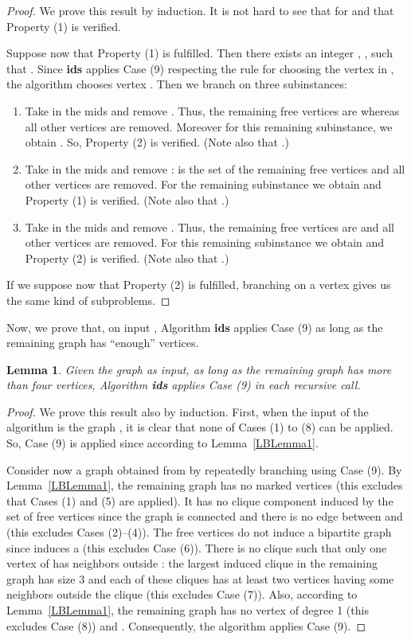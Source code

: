 \documentclass[a4paper,10pt]{article}
\theoremstyle{plain}
\newtheorem{lemma}[theorem]{Lemma}
\theoremstyle{definition}
\theoremstyle{remark}
\newcommand{\mids}{mids\xspace}
\begin{document}
\begin{proof}
We prove this result by induction. It is not hard to see that 
for  and that Property (1) is verified.

Suppose now that Property (1) is fulfilled. Then there exists an integer , ,
such that .
Since {\bf ids} applies Case (9) respecting the rule for choosing the vertex in ,
the algorithm chooses vertex .
Then we branch on three subinstances:
\begin{enumerate}[(b1)]
\item Take  in the \mids and remove .
Thus, the remaining free vertices are 
whereas all other vertices are removed. Moreover for this remaining
subinstance, we obtain . So, Property
(2) is verified.
(Note also that .)

\item Take  in the \mids and remove :
 is the set of the remaining free vertices
and all other vertices are removed. For the remaining
subinstance we obtain 
and Property (1) is verified.
(Note also that .)

\item Take  in the \mids and remove . Thus,
the remaining free vertices are 
and all other vertices are removed. For this remaining
subinstance we obtain 
and Property (2) is verified.
(Note also that .)
\end{enumerate}

If we suppose now that Property (2) is fulfilled, branching on
a vertex  gives us the same kind of subproblems.
\end{proof}

Now, we prove that, on input ,
Algorithm {\bf ids} applies Case (9) as long as
the remaining graph has ``enough'' vertices.

\begin{lemma}
Given the graph  as input,
as long as the remaining graph has more than four vertices,
Algorithm {\bf ids} applies Case (9) in each recursive call.
\end{lemma}

\begin{proof}
We prove this result also by induction.
First, when the input of the algorithm is the graph ,
it is clear that none of Cases (1) to (8) can be applied.
So, Case (9) is applied since  according
to Lemma~\ref{LBLemma1}.

Consider now a graph obtained from  by repeatedly
branching using Case (9).
By Lemma~\ref{LBLemma1}, the remaining graph
has no marked vertices (this excludes that
Cases (1) and (5) are applied). It has no clique component induced by the set of free vertices
since the graph is connected and there is no edge between
 and  (this excludes Cases (2)--(4)). The free vertices do not induce a bipartite graph
since  induces a  (this excludes Case (6)). There is no clique 
such that only one vertex of  has neighbors outside : the largest induced clique in the remaining
graph has size 3 and each of these cliques has at least two vertices having some neighbors outside
the clique (this excludes Case (7)). Also, according to Lemma~\ref{LBLemma1}, the remaining graph
has no vertex of degree 1 (this excludes Case (8)) and .
Consequently, the algorithm applies Case (9).
\end{proof}
\end{document}
